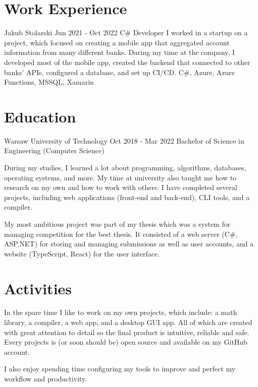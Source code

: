 \begin{tcolorbox}
\begin{minipage}[t]{0.7\textwidth}
\begin{tcolorbox}[grow to right by=0.75cm,height=0.8\textheight,colframe=white,colback=white]
            \section*{Work Experience}
            \work
            {Jakub Stolarski}
            {Jun 2021 - Oct 2022}
            {C\# Developer} {
                I worked in a startup on a project, which focused on creating a mobile app that aggregated account information from many different banks.
                During my time at the company, I developed most of the mobile app,
                created the backend that connected to other banks’ APIs,
                configured a database, and set up CI/CD.
            }
            {C\#, Azure, Azure Functions, MSSQL, Xamarin}
            
            \section*{Education}
            \education
            {Warsaw University of Technology}
            {Oct 2018 - Mar 2022}
            {Bachelor of Science in Engineering (Computer Science)}
            {
                During my studies, I learned a lot about programming, algorithms, databases, operating systems, and more.
                My time at university also taught me how to research on my own and how to work with others.
                I have completed several projects, including web applications (front-end and back-end), CLI tools, and a compiler.
                
                My most ambitious project was part of my thesis which was a system for managing competition for the best thesis.
                It consisted of a web server (C\#, ASP.NET) for storing and managing submissions as well as user accounts,
                and a website (TypeScript, React) for the user interface.
            } 
            \section*{Activities}
            
            In the spare time I like to work on my own projects, which include: a math library, a compiler, a web app, and a desktop GUI app.
            All of which are created with great attention to detail so the final product is intuitive, reliable and safe.
            Every projects is (or soon should be) open source and available on my GitHub account.
            
            I also enjoy spending time configuring my tools to improve and perfect my workflow and productivity.
        \end{tcolorbox}
    \end{minipage}
\end{tcolorbox}


